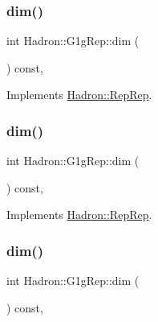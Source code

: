 \subsubsection{\texorpdfstring{dim()}{dim()}\hspace{0.1cm}{\footnotesize\ttfamily [1/5]}}
{\footnotesize\ttfamily int Hadron\+::\+G1g\+Rep\+::dim (\begin{DoxyParamCaption}{ }\end{DoxyParamCaption}) const\hspace{0.3cm}{\ttfamily [inline]}, {\ttfamily [virtual]}}



Implements \mbox{\hyperlink{structHadron_1_1RepRep_a92c8802e5ed7afd7da43ccfd5b7cd92b}{Hadron\+::\+Rep\+Rep}}.

\mbox{\label{structHadron_1_1G1gRep_aa6f93ed967ef889de7a9f5aaad48a69b}} 
\subsubsection{\texorpdfstring{dim()}{dim()}\hspace{0.1cm}{\footnotesize\ttfamily [2/5]}}
{\footnotesize\ttfamily int Hadron\+::\+G1g\+Rep\+::dim (\begin{DoxyParamCaption}{ }\end{DoxyParamCaption}) const\hspace{0.3cm}{\ttfamily [inline]}, {\ttfamily [virtual]}}



Implements \mbox{\hyperlink{structHadron_1_1RepRep_a92c8802e5ed7afd7da43ccfd5b7cd92b}{Hadron\+::\+Rep\+Rep}}.

\mbox{\label{structHadron_1_1G1gRep_aa6f93ed967ef889de7a9f5aaad48a69b}} 
\subsubsection{\texorpdfstring{dim()}{dim()}\hspace{0.1cm}{\footnotesize\ttfamily [3/5]}}
{\footnotesize\ttfamily int Hadron\+::\+G1g\+Rep\+::dim (\begin{DoxyParamCaption}{ }\end{DoxyParamCaption}) const\hspace{0.3cm}{\ttfamily [inline]}, {\ttfamily [virtual]}}



